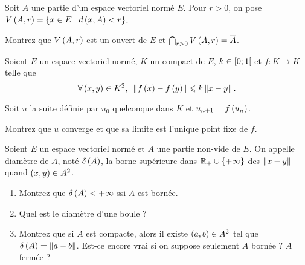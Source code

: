 \begin{exopss}[Exercice 21]
Soit \(A\) une partie d'un espace vectoriel normé \(E\). Pour \(r>0\), on pose \(V\left(A,r\right)=\left\lbrace x\in E\;\middle|\; d\left(x,A\right)<r\right\rbrace\).

Montrez que \(V\left(A,r\right)\) est un ouvert de \(E\) et \(\bigcap_{r>0}V\left(A,r\right)=\overline{A}\).
\end{exopss}



\begin{exopss}[Exercice 22]
Soient \(E\) un espace vectoriel normé, \(K\) un compact de \(E\), \(k\in\left[0;1\right[\) et \(f:K\to K\) telle que \[\quantifs{\forall\paren{x,y}\in K^2}\norme{f\paren{x}-f\paren{y}}\leq k\norme{x-y}.\]

Soit \(u\) la suite définie par \(u_0\) quelconque dans \(K\) et \(u_{n+1}=f\left(u_n\right)\).

Montrez que \(u\) converge et que sa limite est l'unique point fixe de \(f\).
\end{exopss}



\begin{exoss}[Exercice 23]
Soient \(E\) un espace vectoriel normé et \(A\) une partie non-vide de \(E\). On appelle diamètre de \(A\), noté \(\delta\left(A\right)\), la borne supérieure dans \(\mathbb{R}_+\cup\left\lbrace+\infty\right\rbrace\) des \(\norme{x-y}\) quand \(\left(x,y\right)\in A^2\).

\begin{enumerate}
    \item Montrez que \(\delta\left(A\right)<+\infty\) ssi \(A\) est bornée. \\
    \item Quel est le diamètre d'une boule ? \\
    \item Montrez que si \(A\) est compacte, alors il existe \(\left(a,b\right)\in A^2\) tel que \(\delta\paren{A}=\norme{a-b}\). Est-ce encore vrai si on suppose seulement \(A\) bornée ? \(A\) fermée ?
\end{enumerate}
\end{exoss}



